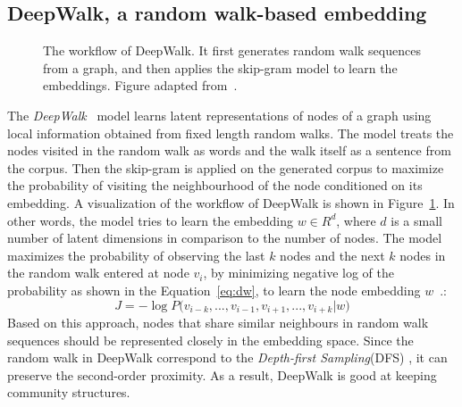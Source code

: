 \subsection{DeepWalk, a random walk-based embedding}
\label{subsec:DeepWalk}
\begin{figure}
\centering 
\resizebox{0.8\textwidth}{0.35\textwidth}{      

}
\caption{The workflow of DeepWalk. It first generates random walk sequences from a graph, and then applies the skip-gram model to learn the embeddings. Figure adapted from~.}
\label{fig:deepwalk}
\end{figure}

The \emph{DeepWalk}~ model learns latent representations of nodes of a graph using local information obtained from fixed length random walks. The model treats the nodes visited in the random walk as words and the walk itself as  a sentence from the corpus. Then the skip-gram is applied on the generated corpus to maximize the probability of visiting the neighbourhood of the node conditioned on its embedding. A visualization of the workflow of DeepWalk is shown in Figure~\ref{fig:deepwalk}. In other words, the model tries to learn the embedding $w\in R^{ d} $, where $d$ is a small number of latent dimensions in comparison to the number of nodes. The model maximizes the probability of observing the last $k$ nodes and the next $k$ nodes in the random walk entered at node $v_{i}$, by minimizing negative log of the probability as shown in the Equation~\ref{eq:dw}, to learn the node embedding $w$~.: 
\begin{equation}
J=-\log { P( } v_{ { i−k } },...,v_{ i−1 },v_{ i+1 },...,v_{ i+k }|w )
\label{eq:dw}
\end{equation}
Based on this approach, nodes that share similar neighbours in random walk sequences should be represented closely in the embedding space. Since the random walk in DeepWalk correspond to the \emph{Depth-first Sampling}(DFS) , it can preserve the second-order proximity. As a result, DeepWalk is good at keeping community structures. 
